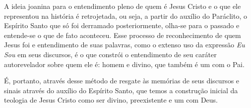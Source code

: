 \documentclass[
    article,            %
	12pt,				%
	oneside,			%
	a4paper,			%
	chapter=TITLE,		%
	section=TITLE,		%
	english,			%
	french,				%
	spanish,			%
	brazil				%
	]{abntex2}
\begin{document}
A ideia joanina para o entendimento pleno de quem é Jesus Cristo e o que ele representou na história é retrojetada, ou seja, a partir do auxílio do Paráclito, o Espírito Santo que só foi derramado posteriormente, olha-se para o passado e entende-se o que de fato aconteceu. Esse processo de reconhecimento de quem Jesus foi e entendimento de suas palavras, como o extenso uso da expressão \emph{Eu Sou} em seus discursos, é o que constrói o entendimento de seu caráter autorevelador sobre quem ele é: homem e divino, que também é um com o Pai.

É, portanto, através desse método de resgate às memórias de seus discursos e sinais através do auxílio do Espírito Santo, que temos a construção inicial da teologia de Jesus Cristo como ser divino, preexistente e um com Deus.
\nocite{JOAO}
\pagebreak
\renewcommand{\bibname}{{REFER\^ENCIAS}}

\end{document}
